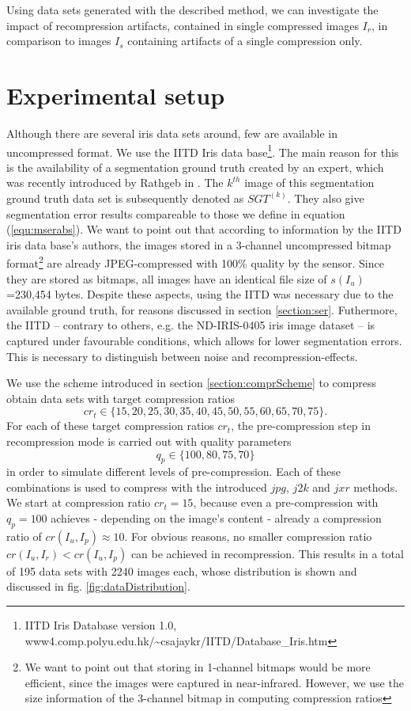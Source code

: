 \documentclass[10pt,twocolumn,letterpaper]{article}
\begin{document}
Using data sets generated with the described method, we can investigate the impact of recompression artifacts, contained in single compressed images $I_r$, in comparison to images $I_s$  containing artifacts of a single compression only.

\section{Experimental setup}
\label{section:exSetup}
Although there are several iris data sets around, few are available in uncompressed format. We use the IITD Iris data base\footnote{IITD Iris Database version 1.0, www4.comp.polyu.edu.hk/\textasciitilde csajaykr/IITD/Database\_Iris.htm}. The main reason for this is the availability of a segmentation ground truth created by an expert, which was recently introduced by Rathgeb \etal in \cite{severeCompression}. The $k^{th}$ image of this segmentation ground truth data set is subsequently denoted as $SGT^{(k)}$. They also give segmentation error results compareable to those we define in equation (\ref{equ:mserabs}).
We want to point out that according to information by the IITD iris data base's authors, the images stored in a 3-channel uncompressed bitmap format\footnote{We want to point out that storing in 1-channel bitmaps would be more efficient, since the images were captured in near-infrared. However, we use the size information of the 3-channel bitmap in computing compression ratios} are already JPEG-compressed with 100\% quality by the sensor. Since they are stored as bitmaps, all images have an identical file size of $s(I_u)$=230,454 bytes. Despite these aspects, using the IITD was necessary due to the available ground truth, for reasons discussed in section \ref{section:ser}. Futhermore, the IITD -- contrary to others, e.g. the ND-IRIS-0405 iris image dataset \cite{Bowyer_thend-iris-0405}-- is captured under favourable conditions, which allows for lower segmentation errors. This is necessary to distinguish between noise and recompression-effects. 

We use the scheme introduced in section \ref{section:comprScheme} to compress obtain data sets with target compression ratios
\begin{equation}
	cr_t \in \{15,20,25,30,35,40,45,50,55,60,65,70,75\}.
\end{equation}
For each of these target compression ratios $cr_t$, the pre-compression step in recompression mode is carried out with quality parameters
\begin{equation}
	q_p \in \{100, 80, 75, 70\}
\end{equation} 
in order to simulate different levels of pre-compression. Each of these combinations is used to compress with the introduced $jpg$, $j2k$ and $jxr$ methods. We start at compression ratio $cr_t=15$, because even a pre-compression with $q_p=100$ achieves - depending on the image's content - already a compression ratio of $cr(I_u, I_p) \approx 10$. For obvious reasons, no smaller compression ratio $cr(I_u, I_r) < cr(I_u, I_p)$ can be achieved in recompression.  This results in a total of 195 data sets with 2240 images each, whose distribution is shown and discussed in fig. \ref{fig:dataDistribution}.
\end{document}
